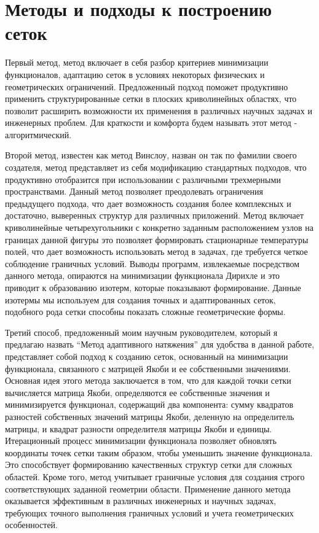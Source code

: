 \documentclass[a4paper,14pt,russian]{extreport}
\renewcommand{\_}{\kern-1.5pt\textunderscore\kern-1.5pt}
\begin{document}
\section{Методы и подходы к построению сеток}
\par Первый метод, метод включает в себя разбор критериев минимизации функционалов, адаптацию сеток в условиях некоторых физических и геометрических ограничений. Предложенный подход поможет продуктивно применить структурированные сетки в плоских криволинейных областях, что позволит расширить возможности их применения в различных научных задачах и инженерных проблем. Для краткости и комфорта будем называть этот метод - алгоритмический. 
\par Второй метод, известен как метод Винслоу, назван он так по фамилии своего создателя, метод представляет из себя модификацию стандартных подходов, что продуктивно отобразится при использовании с различными трехмерными пространствами. Данный метод позволяет преодолевать ограничения предыдущего подхода, что дает возможность создания более комплексных и достаточно, выверенных структур для различных приложений. 
 Метод включает криволинейные четырехугольники с конкретно заданным расположением узлов на границах данной фигуры это позволяет формировать стационарные температуры полей, что дает возможность использовать метод в задачах, где требуется четкое соблюдение граничных условий. Выводы программ, извлекаемые посредством данного метода, опираются на минимизации функционала Дирихле и это приводит к образованию изотерм, которые показывают формирование. Данные изотермы мы используем для создания точных и адаптированных сеток, подобного рода сетки способны показать сложные геометрические формы.
\par Третий способ, предложенный моим научным руководителем, который я предлагаю назвать “Метод адаптивного натяжения” для удобства в данной работе, представляет собой подход к созданию сеток, основанный на минимизации функционала, связанного с матрицей Якоби и ее собственными значениями. Основная идея этого метода заключается в том, что для каждой точки сетки вычисляется матрица Якоби, определяются ее собственные значения и минимизируется функционал, содержащий два компонента: сумму квадратов разностей собственных значений матрицы Якоби, деленную на определитель матрицы, и квадрат разности определителя матрицы Якоби и единицы. Итерационный процесс минимизации функционала позволяет обновлять координаты точек сетки таким образом, чтобы уменьшить значение функционала. Это способствует формированию качественных структур сетки для сложных областей. Кроме того, метод учитывает граничные условия для создания строго соответствующих заданной геометрии области. Применение данного метода оказывается эффективным в различных инженерных и научных задачах, требующих точного выполнения граничных условий и учета геометрических особенностей.
\end{document}
